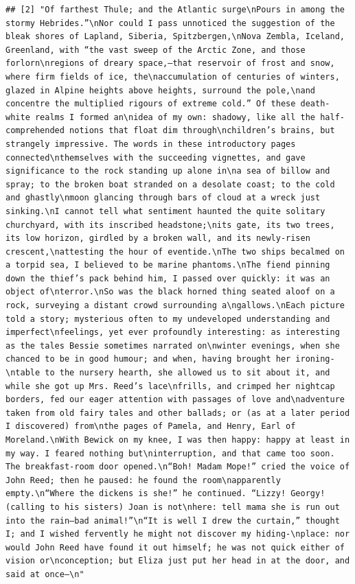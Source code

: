 \documentclass[
]{book}
\begin{document}
\begin{verbatim}
## [2] "Of farthest Thule; and the Atlantic surge\nPours in among the stormy Hebrides.”\nNor could I pass unnoticed the suggestion of the bleak shores of Lapland, Siberia, Spitzbergen,\nNova Zembla, Iceland, Greenland, with “the vast sweep of the Arctic Zone, and those forlorn\nregions of dreary space,—that reservoir of frost and snow, where firm fields of ice, the\naccumulation of centuries of winters, glazed in Alpine heights above heights, surround the pole,\nand concentre the multiplied rigours of extreme cold.” Of these death-white realms I formed an\nidea of my own: shadowy, like all the half-comprehended notions that float dim through\nchildren’s brains, but strangely impressive. The words in these introductory pages connected\nthemselves with the succeeding vignettes, and gave significance to the rock standing up alone in\na sea of billow and spray; to the broken boat stranded on a desolate coast; to the cold and ghastly\nmoon glancing through bars of cloud at a wreck just sinking.\nI cannot tell what sentiment haunted the quite solitary churchyard, with its inscribed headstone;\nits gate, its two trees, its low horizon, girdled by a broken wall, and its newly-risen crescent,\nattesting the hour of eventide.\nThe two ships becalmed on a torpid sea, I believed to be marine phantoms.\nThe fiend pinning down the thief’s pack behind him, I passed over quickly: it was an object of\nterror.\nSo was the black horned thing seated aloof on a rock, surveying a distant crowd surrounding a\ngallows.\nEach picture told a story; mysterious often to my undeveloped understanding and imperfect\nfeelings, yet ever profoundly interesting: as interesting as the tales Bessie sometimes narrated on\nwinter evenings, when she chanced to be in good humour; and when, having brought her ironing-\ntable to the nursery hearth, she allowed us to sit about it, and while she got up Mrs. Reed’s lace\nfrills, and crimped her nightcap borders, fed our eager attention with passages of love and\nadventure taken from old fairy tales and other ballads; or (as at a later period I discovered) from\nthe pages of Pamela, and Henry, Earl of Moreland.\nWith Bewick on my knee, I was then happy: happy at least in my way. I feared nothing but\ninterruption, and that came too soon. The breakfast-room door opened.\n“Boh! Madam Mope!” cried the voice of John Reed; then he paused: he found the room\napparently empty.\n“Where the dickens is she!” he continued. “Lizzy! Georgy! (calling to his sisters) Joan is not\nhere: tell mama she is run out into the rain—bad animal!”\n“It is well I drew the curtain,” thought I; and I wished fervently he might not discover my hiding-\nplace: nor would John Reed have found it out himself; he was not quick either of vision or\nconception; but Eliza just put her head in at the door, and said at once—\n"
\end{verbatim}
\end{document}
